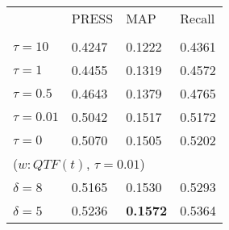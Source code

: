 {

\ttfamily\small

\begin{tabular}{llll}
\toprule\noalign{\smallskip} 
        & PRESS & MAP & Recall \\
\noalign{\smallskip} 
\midrule
\noalign{\smallskip} 

\multicolumn{3}{l}{($w:1$, $\delta=8$)}      &   \\ 
 $\tau=10 $  & 0.4247  & 0.1222 & 0.4361  \\
\hline
$\tau=1 $    & 0.4455  & 0.1319 & 0.4572 \\
\hline
$\tau=0.5 $  & 0.4643  & 0.1379 & 0.4765 \\
\hline
$\tau=0.01 $ & 0.5042  & 0.1517  &  0.5172 \\
\hline
$\tau=0 $    & 0.5070  & 0.1505            & 0.5202 \\
\hline
\multicolumn{3}{l}{($w:QTF(t)$, $\tau=0.01 $)} &   \\ 
$\delta=8$                    & 0.5165 & 0.1530 & 0.5293 \\
\hline
$\delta=5$                    & 0.5236 & \bfseries 0.1572 & 0.5364 \\
\bottomrule 
\end{tabular}


}
